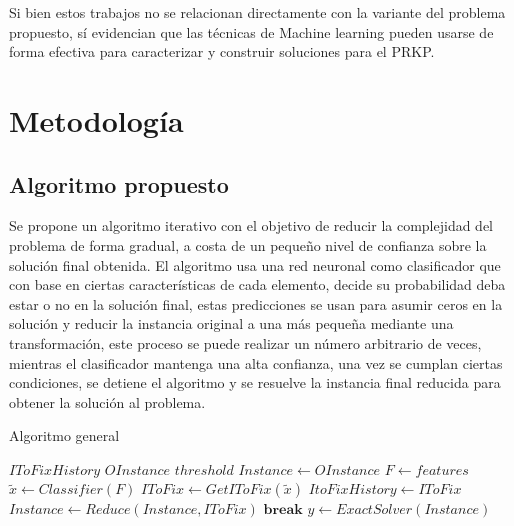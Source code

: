 \documentclass[spanish, a4paper, 12pt, openany,final]{book}
\begin{document}
Si bien estos trabajos no se relacionan directamente con la variante del problema propuesto, sí evidencian que las técnicas de Machine learning pueden usarse de forma efectiva para caracterizar y construir soluciones para el PRKP.
  



\chapter{Metodología}

\section{Algoritmo propuesto}

Se propone un algoritmo iterativo con el objetivo de reducir la complejidad del problema de forma gradual, a costa de un pequeño nivel de confianza sobre la solución final obtenida. El algoritmo usa una red neuronal como clasificador que con base en ciertas características de cada elemento, decide su probabilidad deba estar o no en la solución final, estas predicciones se usan para asumir ceros en la solución y reducir la instancia original a una más pequeña mediante una transformación, este proceso se puede realizar un número arbitrario de veces, mientras el clasificador mantenga una alta confianza, una vez se cumplan ciertas condiciones, se detiene el algoritmo y se resuelve la instancia final reducida para obtener la solución al problema.

\begin{algorithm}[H]
	\caption{Algoritmo general}\label{alg:general}
	\begin{algorithmic}
		\State $IToFixHistory$ 			
		\State $OInstance$ 				
		\State $threshold$  			
		\State $Instance \gets OInstance$
		\Loop
			\State $F \gets features$ 
			\State $\tilde{x} \gets Classifier(F)$ 
			\State $IToFix \gets GetIToFix(\tilde{x})$ 
			\State $ItoFixHistory \gets IToFix$
			\State $Instance \gets Reduce(Instance,IToFix)$ 
				\State $\textbf{break}$ 
			\EndIf
		\State $y \gets ExactSolver(Instance)$ 
		\EndLoop
	\end{algorithmic}
\end{algorithm}
\end{document}

